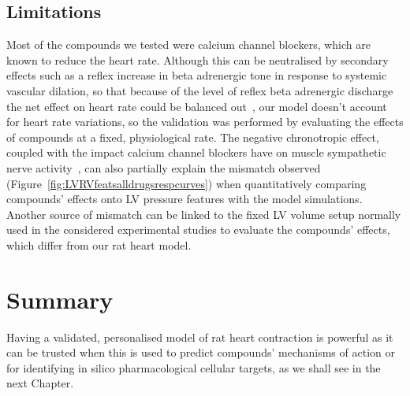 \subsection{Limitations}\label{sec:ch6limitations}
Most of the compounds we tested were calcium channel blockers, which are known to reduce the heart rate. Although this can be neutralised by secondary effects such as a reflex increase in beta adrenergic tone in response to systemic vascular dilation, so that because of the level of reflex beta adrenergic discharge the net effect on heart rate could be balanced out~\cite{Low:1982}, our model doesn't account for heart rate variations, so the validation was performed by evaluating the effects of compounds at a fixed, physiological rate. The negative chronotropic effect, coupled with the impact calcium channel blockers have on muscle sympathetic nerve activity~\cite{Binggeli:2002}, can also partially explain the mismatch observed (Figure~\ref{fig:LVRVfeatsalldrugsrespcurves}) when quantitatively comparing compounds' effects onto LV pressure features with the model simulations. Another source of mismatch can be linked to the fixed LV volume setup normally used in the considered experimental studies to evaluate the compounds' effects, which differ from our rat heart model.


%
%
%
\section{Summary}\label{sec:ch6summary}
Having a validated, personalised model of rat heart contraction is powerful as it can be trusted when this is used to predict compounds' mechanisms of action or for identifying in silico pharmacological cellular targets, as we shall see in the next Chapter.